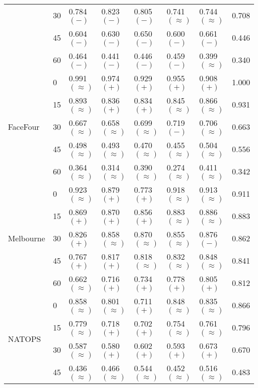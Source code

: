 \documentclass{llncs}
\begin{document}
\begin{table*}[h!]
\begin{tabular*}{\linewidth}{l @{\extracolsep{\fill}} l l l l l l l}
    & 30 & 0.784 $(-)$ & 0.823 $(-)$ & 0.805 $(-)$ &0.741 $(\approx)$ &0.744 $(\approx)$ & 0.708 \\
    & 45 & 0.604 $(-)$ & 0.630 $(-)$ & 0.650 $(-)$ & 0.600 $(-)$ & 0.661 $(-)$ & 0.446 \\
    & 60 & 0.464 $(-)$ & 0.441 $(-)$ & 0.446 $(-)$ & 0.459 $(-)$ & 0.399 $(\approx)$ & 0.340\\
    \midrule
    \multirow{5}{0.13\linewidth}{FaceFour}
    & 0 & 0.991 $(\approx)$ & 0.974 $(+)$ & 0.929 $(+)$ & 0.955 $(+)$ & 0.908 $(+)$ & 1.000 \\
    & 15 & 0.893 $(\approx)$ & 0.836 $(+)$ & 0.834 $(+)$ & 0.845 $(\approx)$ & 0.866 $(\approx)$ & 0.931\\
    & 30 & 0.667 $(\approx)$ & 0.658 $(\approx)$ & 0.699 $(\approx)$ & 0.719 $(-)$ & 0.706 $(\approx)$ & 0.663\\
    & 45 & 0.498 $(\approx)$ & 0.493 $(\approx)$ & 0.470 $(\approx)$ & 0.455 $(\approx)$ & 0.504 $(\approx)$ & 0.556\\
    & 60 & 0.364 $(\approx)$ & 0.314 $(\approx)$ & 0.390 $(\approx)$ & 0.274 $(\approx)$ & 0.411 $(\approx)$ & 0.342\\
    \midrule
    \multirow{5}{0.13\linewidth}{Melbourne}
    & 0 & 0.923 $(\approx)$ & 0.879 $(+)$ & 0.773 $(+)$ & 0.918 $(\approx)$ & 0.913 $(\approx)$ & 0.911\\
    & 15 & 0.869 $(+)$ & 0.870 $(+)$ & 0.856 $(+)$ & 0.883 $(\approx)$ & 0.886 $(\approx)$ & 0.883\\
    & 30 & 0.826 $(+)$ & 0.858 $(\approx)$ & 0.870 $(\approx)$ & 0.855 $(\approx)$ & 0.876 $(-)$ & 0.862\\
    & 45 & 0.767 $(+)$ & 0.817 $(+)$ & 0.818 $(\approx)$ & 0.832 $(\approx)$ & 0.848 $(\approx)$ & 0.841\\
    & 60 & 0.662 $(\approx)$ & 0.716 $(+)$ & 0.734 $(+)$ & 0.778 $(+)$ & 0.805 $(+)$ & 0.812\\
    \midrule
    \multirow{5}{0.13\linewidth}{NATOPS}
    & 0 & 0.858 $(\approx)$ & 0.801 $(\approx)$ & 0.711 $(+)$ & 0.848 $(\approx)$ & 0.835 $(\approx)$ & 0.866\\
    & 15 & 0.779 $(\approx)$ & 0.718 $(+)$ & 0.702 $(+)$ & 0.754 $(\approx)$ & 0.761 $(\approx)$ & 0.796\\
    & 30 & 0.587 $(\approx)$ & 0.580 $(+)$ & 0.602 $(+)$ & 0.593 $(+)$ & 0.673 $(+)$ & 0.670\\
    & 45 & 0.436 $(\approx)$ & 0.466 $(\approx)$ & 0.544 $(\approx)$ & 0.452 $(\approx)$ & 0.516 $(\approx)$ & 0.483\\

\end{tabular*}
\end{table*}
\end{document}
